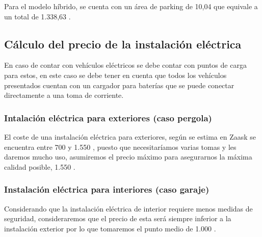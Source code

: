 Para el modelo híbrido, se cuenta con un área de parking de 10,04  que equivale a un total de 1.338,63 .

\subsection{Cálculo del precio de la instalación eléctrica}
En caso de contar con vehículos eléctricos se debe contar con puntos de carga para estos, en este caso se debe tener en cuenta que todos los vehículos presentados cuentan con un cargador para baterías que se puede conectar directamente a una toma de corriente.

\subsubsection{Intalación eléctrica para exteriores (caso pergola)} El coste de una instalación eléctrica para exteriores, según se estima en Zaask \cite{zaaskiem} se encuentra entre 700 y 1.550 , puesto que necesitaríamos varias tomas y les daremos mucho uso, asumiremos el precio máximo para asegurarnos la máxima calidad posible, 1.550 .

\subsubsection{Instalación eléctrica para interiores (caso garaje)} Considerando que la instalación eléctrica de interior requiere menos medidas de seguridad, consideraremos que el precio de esta será siempre inferior a la instalación exterior por lo que tomaremos el punto medio de 1.000 .


